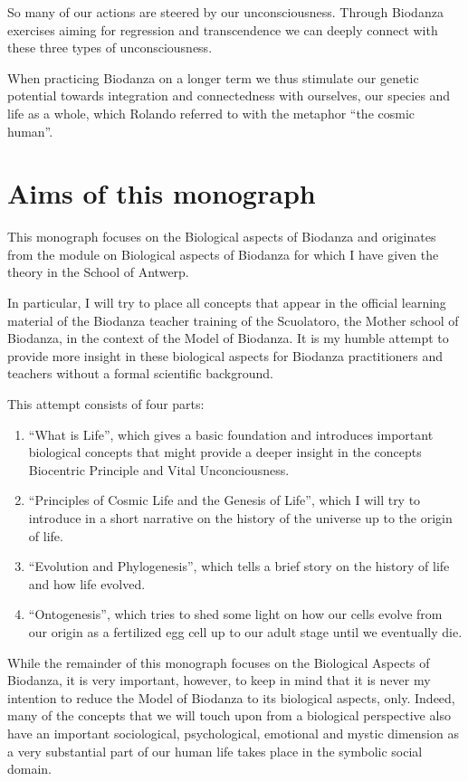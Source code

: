 \documentclass[
  11pt,
]{book}
\begin{document}
So many of our actions are steered by our unconsciousness.
Through Biodanza exercises aiming for regression and transcendence we can deeply connect with these three types of unconsciousness.

When practicing Biodanza on a longer term we thus stimulate our genetic potential towards integration and connectedness with ourselves, our species and life as a whole, which Rolando referred to with the metaphor ``the cosmic human''.

\newpage

\hypertarget{aims-of-this-monograph}{%
\section{Aims of this monograph}\label{aims-of-this-monograph}}

This monograph focuses on the Biological aspects of Biodanza and originates from the module on Biological aspects of Biodanza for which I have given the theory in the School of Antwerp.

In particular, I will try to place all concepts that appear in the official learning material of the Biodanza teacher training of the Scuolatoro, the Mother school of Biodanza, in the context of the Model of Biodanza. It is my humble attempt to provide more insight in these biological aspects for Biodanza practitioners and teachers without a formal scientific background.

This attempt consists of four parts:

\begin{enumerate}
\def\labelenumi{\arabic{enumi}.}
\item
  ``What is Life'', which gives a basic foundation and introduces important biological concepts that might provide a deeper insight in the concepts Biocentric Principle and Vital Unconciousness.
\item
  ``Principles of Cosmic Life and the Genesis of Life'', which I will try to introduce in a short narrative on the history of the universe up to the origin of life.
\item
  ``Evolution and Phylogenesis'', which tells a brief story on the history of life and how life evolved.
\item
  ``Ontogenesis'', which tries to shed some light on how our cells evolve from our origin as a fertilized egg cell up to our adult stage until we eventually die.
\end{enumerate}

While the remainder of this monograph focuses on the Biological Aspects of Biodanza, it is very important, however, to keep in mind that it is never my intention to reduce the Model of Biodanza to its biological aspects, only. Indeed, many of the concepts that we will touch upon from a biological perspective also have an important sociological, psychological, emotional and mystic dimension as a very substantial part of our human life takes place in the symbolic social domain.
\end{document}
